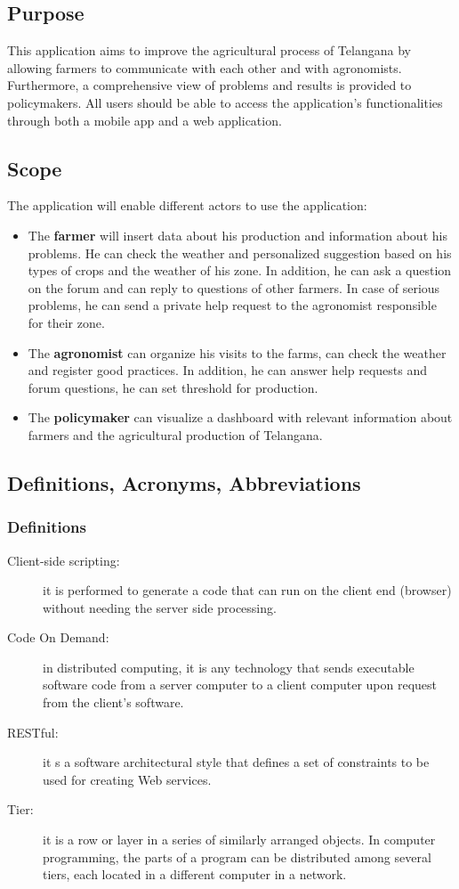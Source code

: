 \subsection{Purpose}
This application aims to improve the agricultural process of Telangana by allowing farmers to communicate with each other and with agronomists.
Furthermore, a comprehensive view of problems and results is provided to policymakers.
All users should be able to access the application's functionalities through both a mobile app and a web application.
\subsection{Scope}
The application will enable different actors to use the application:

\begin{itemize}
    \item The \textbf{farmer} will insert data about his production and information about his problems. He can check the weather and personalized suggestion based on his types of crops and the weather of his zone. In addition, he can ask a question on the forum and can reply to questions of other farmers. In case of serious problems, he can send a private help request to the agronomist responsible for their zone.
    \item The \textbf{agronomist} can organize his visits to the farms, can check the weather and register good practices. In addition, he can answer help requests and forum questions, he can set threshold for production.
    \item The \textbf{policymaker} can visualize a dashboard with relevant information about farmers and the agricultural production of Telangana.
\end{itemize}

\subsection{Definitions, Acronyms, Abbreviations}
\subsubsection{Definitions}
\begin{description}
    \item [Client-side scripting:] it is performed to generate a code that can run on the client end (browser) without needing the server side processing.
    \item [Code On Demand:] in distributed computing, it is any technology that sends executable software code from a server computer to a client computer upon request from the client's software.
    \item [RESTful:] it s a software architectural style that defines a set of constraints to be used for creating Web services.
    \item [Tier:] it is a row or layer in a series of similarly arranged objects. In computer programming, the parts of a program can be distributed among several tiers, each located in a different computer in a network.
\end{description}

